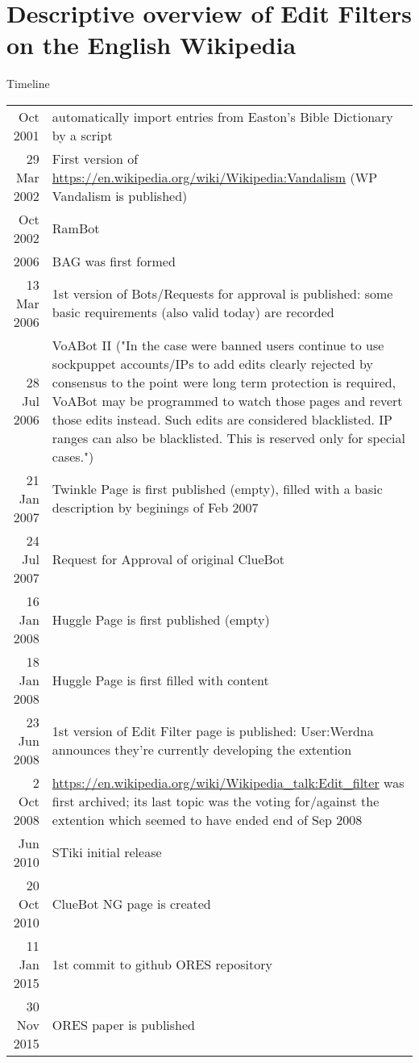 \chapter{Descriptive overview of Edit Filters on the English Wikipedia}
\label{chap:overview-en-wiki}

Timeline
\begin{longtable}{ r | p{}}
   Oct 2001 & automatically import entries from Easton’s Bible Dictionary by a script \\
29 Mar 2002 & First version of \url{https://en.wikipedia.org/wiki/Wikipedia:Vandalism} (WP Vandalism is published) \\
   Oct 2002 & RamBot \\
       2006 & BAG was first formed \\
13 Mar 2006 & 1st version of Bots/Requests for approval is published: some basic requirements (also valid today) are recorded \\
28 Jul 2006 & VoABot II ("In the case were banned users continue to use sockpuppet accounts/IPs to add edits clearly rejected by consensus to the point were long term protection is required, VoABot may be programmed to watch those pages and revert those edits instead. Such edits are considered blacklisted. IP ranges can also be blacklisted. This is reserved only for special cases.") \\
21 Jan 2007 & Twinkle Page is first published (empty), filled with a basic description by beginings of Feb 2007 \\
24 Jul 2007 & Request for Approval of original ClueBot \\
16 Jan 2008 & Huggle Page is first published (empty) \\
18 Jan 2008 & Huggle Page is first filled with content \\
23 Jun 2008 & 1st version of Edit Filter page is published: User:Werdna announces they're currently developing the extention \\
 2 Oct 2008 & \url{https://en.wikipedia.org/wiki/Wikipedia_talk:Edit_filter} was first archived; its last topic was the voting for/against the extention which seemed to have ended end of Sep 2008 \\
   Jun 2010 & STiki initial release \\
20 Oct 2010 & ClueBot NG page is created \\
11 Jan 2015 & 1st commit to github ORES repository \\
30 Nov 2015 & ORES paper is published
\end{longtable}

